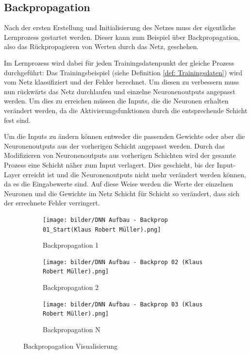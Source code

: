 \subsection{Backpropagation}
\label{subsection:Backprop}
Nach der ersten Erstellung und Initialisierung des Netzes muss der eigentliche Lernprozess gestartet werden. Dieser kann zum Beispiel über Backpropagation, also das Rückpropagieren von Werten durch das Netz, geschehen. \cite{} 

Im Lernprozess wird dabei für jeden Trainingsdatenpunkt der gleiche Prozess durchgeführt: Das Trainingsbeispiel (siehe Definition \ref{def: Trainingsdaten}) wird vom Netz klassifiziert und der Fehler berechnet. Um diesen zu verbessern muss nun rückwärts das Netz durchlaufen und einzelne Neuronenoutputs angepasst werden. Um dies zu erreichen müssen die Inputs, die die Neuronen erhalten verändert werden, da die Aktivierungsfunktionen durch die entsprechende Schicht fest sind. \cite{Goodfellow-et-al-2016, 10.5555/2283516.2283603} 


Um die Inputs zu ändern können entweder die passenden Gewichte oder aber die Neuronenoutputs aus der vorherigen Schicht angepasst werden. Durch das Modifizieren von Neuronenoutputs aus vorherigen Schichten wird der gesamte Prozess eine Schicht näher zum Input verlagert. Dies geschieht, bis der Input-Layer erreicht ist und die Neuronenoutputs nicht mehr verändert werden können, da es die Eingabewerte sind. Auf diese Weise werden die Werte der einzelnen Neuronen und die Gewichte im Netz Schicht für Schicht so verändert, dass sich der errechnete Fehler verringert. \cite{Goodfellow-et-al-2016, 10.5555/2283516.2283603} 


\begin{figure}[H]
	\begin{subfigure}[b]{0.32\linewidth}
		\centering
		\texttt{[image: bilder/DNN Aufbau - Backprop 01\_Start(Klaus Robert Müller).png]}
		\caption{Backpropagation 1}
		\label{Backpropagation 1}
	\end{subfigure}
	\begin{subfigure}[b]{0.32\linewidth}
		\centering
		\texttt{[image: bilder/DNN Aufbau - Backprop 02 (Klaus Robert Müller).png]}
		\caption{Backpropagation 2}
		\label{Backpropagation 2}
	\end{subfigure}	
	\begin{subfigure}[b]{0.32 \linewidth}
		\centering
		\texttt{[image: bilder/DNN Aufbau - Backprop 03 (Klaus Robert Müller).png]}
		\caption{Backpropagation N}
		\label{Backpropagation N}
	\end{subfigure}
	
	\caption{Backpropagation Visualisierung}
\end{figure}



